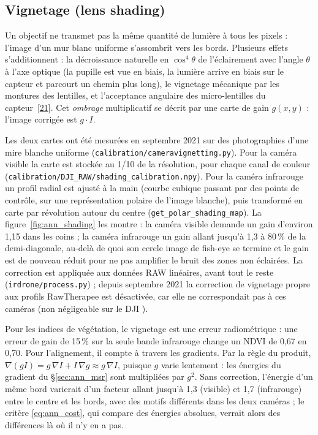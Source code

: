 \documentclass[a4paper,11pt]{report}
\begin{document}
\subsection{Vignetage (lens shading)}\label{sec:ann_shading}
Un objectif ne transmet pas la même quantité de lumière à tous les pixels : l'image d'un mur blanc uniforme s'assombrit vers les bords. Plusieurs effets s'additionnent : la décroissance naturelle en $\cos^4\theta$ de l'éclairement avec l'angle $\theta$ à l'axe optique (la pupille est vue en biais, la lumière arrive en biais sur le capteur et parcourt un chemin plus long), le vignetage mécanique par les montures des lentilles, et l'acceptance angulaire des micro-lentilles du capteur~[\hyperref[ann_goldman]{21}]. Cet \emph{ombrage} multiplicatif se décrit par une carte de gain $g(x, y)$ : l'image corrigée est $g \cdot I$.

Les deux cartes ont été mesurées en septembre 2021 sur des photographies d'une mire blanche uniforme (\texttt{calibration/cameravignetting.py}). Pour la caméra visible la carte est stockée au 1/10 de la résolution, pour chaque canal de couleur (\texttt{calibration/DJI\_RAW/shading\_calibration.npy}). Pour la caméra infrarouge un profil radial est ajusté à la main (courbe cubique passant par des points de contrôle, sur une représentation polaire de l'image blanche), puis transformé en carte par révolution autour du centre (\texttt{get\_polar\_shading\_map}). La figure~\ref{fig:ann_shading} les montre : la caméra visible demande un gain d'environ 1,15 dans les coins ; la caméra infrarouge un gain allant jusqu'à 1,3 à 80\,\% de la demi-diagonale, au-delà de quoi son cercle image de fish-eye se termine et le gain est de nouveau réduit pour ne pas amplifier le bruit des zones non éclairées. La correction est appliquée aux données RAW linéaires, avant tout le reste (\texttt{irdrone/process.py}) ; depuis septembre 2021 la correction de vignetage propre aux profils RawTherapee est désactivée, car elle ne correspondait pas à ces caméras (\og non négligeable sur le DJI \fg).

Pour les indices de végétation, le vignetage est une erreur radiométrique : une erreur de gain de 15\,\% sur la seule bande infrarouge change un NDVI de 0,67 en 0,70. Pour l'alignement, il compte à travers les gradients. Par la règle du produit, $\nabla(g I) = g\, \nabla I + I\, \nabla g \approx g\, \nabla I$, puisque $g$ varie lentement : les énergies du gradient du §\ref{sec:ann_msr} sont multipliées par $g^2$. Sans correction, l'énergie d'un même bord varierait d'un facteur allant jusqu'à 1,3 (visible) et 1,7 (infrarouge) entre le centre et les bords, avec des motifs différents dans les deux caméras ; le critère \eqref{eq:ann_cost}, qui compare des énergies absolues, verrait alors des différences là où il n'y en a pas.
\end{document}
